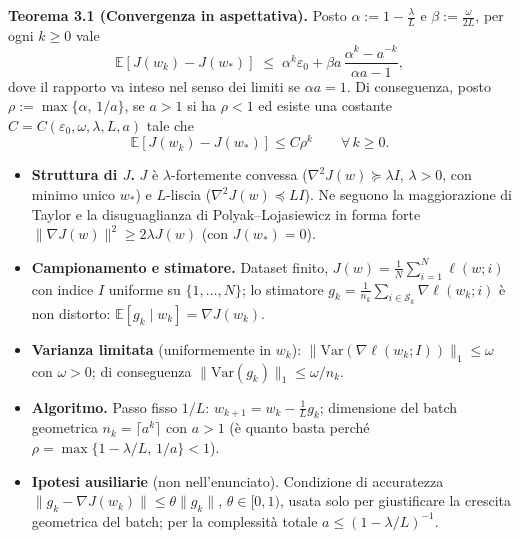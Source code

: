\documentclass[11pt,a4paper]{article}
\begin{document}
\begin{thmbox}
\textbf{Teorema 3.1 (Convergenza in aspettativa).}
Posto $\alpha := 1-\frac{\lambda}{L}$ e $\beta := \frac{\omega}{2L}$, per ogni $k\ge 0$ vale
\[
\mathbb{E}[J(w_k)-J(w_*)] \;\le\; \alpha^k\varepsilon_0
+ \beta a\,\frac{\alpha^k-a^{-k}}{\alpha a-1},
\]
dove il rapporto va inteso nel senso dei limiti se $\alpha a = 1$.
Di conseguenza, posto $\rho := \max\{\alpha,\,1/a\}$, se $a>1$ si ha $\rho<1$ ed esiste una costante $C=C(\varepsilon_0,\omega,\lambda,L,a)$ tale che
\[
\mathbb{E}[J(w_k)-J(w_*)] \le C\rho^k \qquad \forall\, k\ge 0.
\]
\end{thmbox}

\vspace{0.8em}

\begin{ipotesibox}
\begin{itemize}
  \setlength{\itemsep}{2pt}\setlength{\topsep}{2pt}\setlength{\parskip}{0pt}
  \item \textbf{Struttura di $J$.} $J$ è $\lambda$-fortemente convessa
  ($\nabla^2 J(w)\succeq\lambda I$, $\lambda>0$, con minimo unico $w_*$) e
  $L$-liscia ($\nabla^2 J(w)\preceq LI$). Ne seguono la maggiorazione di Taylor
  e la disuguaglianza di Polyak--Lojasiewicz in forma forte
  $\|\nabla J(w)\|^2\ge 2\lambda J(w)$ (con $J(w_*)=0$).
  \item \textbf{Campionamento e stimatore.} Dataset finito,
  $J(w)=\frac{1}{N}\sum_{i=1}^{N}\ell(w;i)$ con indice $I$ uniforme su
  $\{1,\dots,N\}$; lo stimatore
  $g_k=\frac{1}{n_k}\sum_{i\in\mathcal{S}_k}\nabla\ell(w_k;i)$ è non distorto:
  $\mathbb{E}[g_k\mid w_k]=\nabla J(w_k)$.
  \item \textbf{Varianza limitata} (uniformemente in $w_k$):
  $\|\mathrm{Var}(\nabla\ell(w_k;I))\|_1\le\omega$ con $\omega>0$; di conseguenza
  $\|\mathrm{Var}(g_k)\|_1\le\omega/n_k$.
  \item \textbf{Algoritmo.} Passo fisso $1/L$:
  $w_{k+1}=w_k-\frac{1}{L}g_k$; dimensione del batch geometrica
  $n_k=\lceil a^k\rceil$ con $a>1$ (è quanto basta perché
  $\rho=\max\{1-\lambda/L,\,1/a\}<1$).
  \item \textbf{Ipotesi ausiliarie} (non nell'enunciato). Condizione di
  accuratezza $\|g_k-\nabla J(w_k)\|\le\theta\|g_k\|$, $\theta\in[0,1)$, usata
  solo per giustificare la crescita geometrica del batch; per la complessità
  totale $a\le(1-\lambda/L)^{-1}$.
\end{itemize}
\vspace{0.3em}
\end{ipotesibox}
\end{document}

